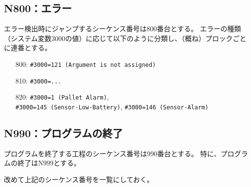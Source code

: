 \subsection{N800：エラー\label{subsec:sequenceNerror}\TBW}
エラー検出時にジャンプするシーケンス番号は800番台とする。
エラーの種類（システム変数\ttNum3000の値）に応じて以下のように分類し、（概ね）プロックごとに連番とする。
\begin{enumerate}
\item[800:] \verb|#3000=121 (Argument is not assigned)|
\item[810:] \verb|#3000=...|
\item[820:] \verb|#3000=1 (Pallet Alarm)|,\\
            \verb|#3000=145 (Sensor-Low-Battery)|, \verb|#3000=146 (Sensor-Alarm)|
\end{enumerate}


\subsection{N990：プログラムの終了\label{subsec:sequenceNprgEnd}}
プログラムを終了する工程のシーケンス番号は990番台とする。
特に、プログラムの終了はN999とする。



\clearpage
\noindent
改めて上記のシーケンス番号を一覧にしておく。\\

